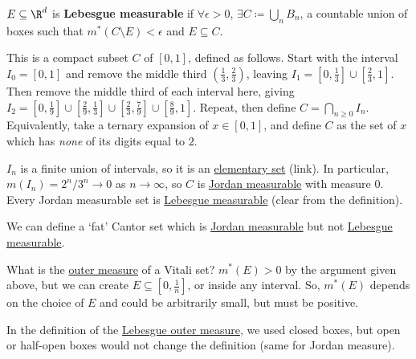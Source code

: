 \documentclass{article}
\newcommand{\1}[1]{\mathbbm{1}_{#1}}
\begin{document}
\begin{defi}
    $E \subseteq \R^d$ is \textbf{Lebesgue measurable} if $\forall \epsilon > 0$, $\exists C \coloneqq \bigcup_{n} B_n$, a countable union of boxes such that $m^*(C \setminus E) < \epsilon$ and $E \subseteq C$.
\end{defi}

\begin{eg} 
    This is a compact subset $C$ of $[0, 1]$, defined as follows.  Start with the interval $I_0 = [0, 1]$ and remove the middle third $\left(\frac13, \frac23\right)$, leaving $I_1 = \left[0, \frac13\right] \cup \left[\frac23, 1\right]$.
    Then remove the middle third of each interval here, giving $I_2 = \left[0, \frac19\right] \cup \left[\frac29, \frac13\right] \cup \left[\frac23, \frac79\right] \cup \left[\frac89, 1\right]$.
    Repeat, then define $C = \bigcap_{n \geq 0} I_n$.
    Equivalently, take a ternary expansion of $x \in [0, 1]$, and define $C$ as the set of $x$ which has \emph{none} of its digits equal to $2$.
\end{eg}

\begin{remark}
    $I_n$ is a finite union of intervals, so it is an \hyperlink{def:elemSubs}{elementary set} (link).
    In particular, $m(I_n) = 2^n / 3^n \to 0$ as $n \to \infty$, so $C$ is \hyperlink{def:jMeasurable}{Jordan measurable} with measure $0$.
    Every Jordan measurable set is \hyperlink{def:lebMAble}{Lebesgue measurable} (clear from the definition).
\end{remark}

We can define a `fat' Cantor set which is \hyperlink{def:jMeasurable}{Jordan measurable} but not \hyperlink{def:lebMAble}{Lebesgue measurable}.

\begin{remark}
    What is the \hyperlink{def:lebOutMeas}{outer measure} of a Vitali set?
    $m^*(E) > 0$ by the argument given above, but we can create $E \subseteq [0, \frac1n]$, or inside any interval. So, $m^*(E)$ depends on the choice of $E$ and could be arbitrarily small, but must be positive.
\end{remark}

\begin{remark}
    In the definition of the \hyperlink{def:lebOutMeas}{Lebesgue outer measure}, we used closed boxes, but open or half-open boxes would not change the definition (same for Jordan measure).
\end{remark}
\end{document}
